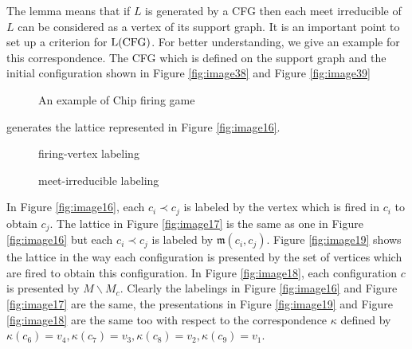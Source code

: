 \documentclass{article}
\theoremstyle{definition}
\begin{document}
The lemma means that if $L$ is generated by a CFG then each meet irreducible of $L$ can be considered as a vertex of its support graph. It is an important point to set up a criterion for ${\rm L(CFG)}$. For better understanding, we give an example for this correspondence. The CFG which is defined on the support graph and the initial configuration shown in Figure \ref{fig:image38} and Figure \ref{fig:image39}
\begin{figure}
\centering
{}
\quad
{}
\caption{An example of Chip firing game}
\end{figure}
\noindent generates the lattice represented in Figure \ref{fig:image16}.\begin{figure}
\centering
{}
\quad
{}
\caption{firing-vertex labeling}
\end{figure}
\begin{figure}
\centering
{}
\quad
{}
\caption{meet-irreducible labeling}
\end{figure}
\noindent In Figure \ref{fig:image16}, each $c_i \prec c_j$ is labeled by the vertex which is fired in $c_i$ to obtain $c_j$. The lattice in Figure \ref{fig:image17} is the same as one in Figure \ref{fig:image16} but each $c_i \prec c_j$ is labeled by $\mathfrak{m}(c_i,c_j)$. Figure \ref{fig:image19} shows the lattice in the way each configuration is presented by the set of vertices which are fired to obtain this configuration. In Figure \ref{fig:image18}, each configuration $c$ is presented by $M\backslash M_c$.  Clearly the labelings in Figure \ref{fig:image16} and Figure \ref{fig:image17} are the same, the presentations in Figure \ref{fig:image19} and Figure \ref{fig:image18} are the same too with respect to the correspondence $\kappa$ defined by $\kappa(c_{6})=v_4,\kappa(c_{7})=v_3,\kappa(c_{8})=v_2,\kappa({c_9})=v_1$.
\end{document}
